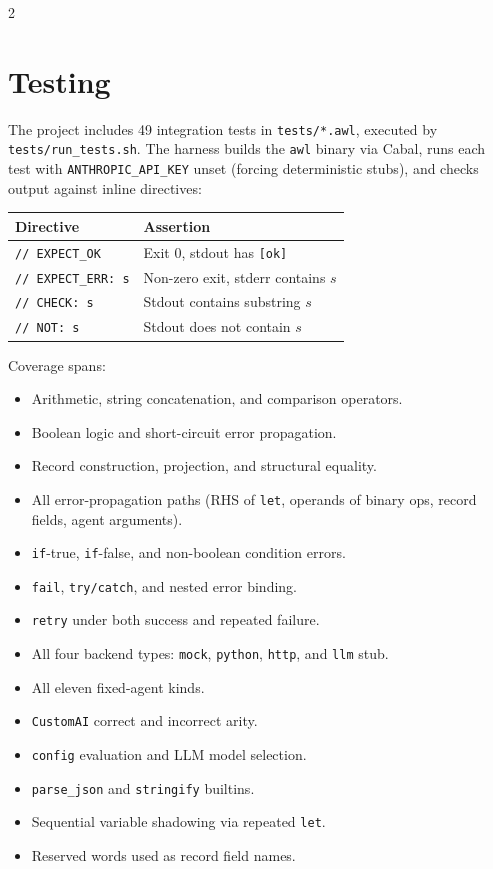 \documentclass[10pt]{article}
\begin{document}
\begin{multicols}{2}
\section{Testing}
\label{sec:testing}

The project includes 49 integration tests in \texttt{tests/*.awl}, executed
by \texttt{tests/run\_tests.sh}.  The harness builds the \texttt{awl}
binary via Cabal, runs each test with \texttt{ANTHROPIC\_API\_KEY} unset
(forcing deterministic stubs), and checks output against inline
directives:

\begin{center}
\small
\begin{tabular}{ll}
\toprule
Directive & Assertion \\
\midrule
\texttt{// EXPECT\_OK}     & Exit 0, stdout has \texttt{[ok]} \\
\texttt{// EXPECT\_ERR: s} & Non-zero exit, stderr contains $s$ \\
\texttt{// CHECK: s}       & Stdout contains substring $s$ \\
\texttt{// NOT: s}         & Stdout does not contain $s$ \\
\bottomrule
\end{tabular}
\end{center}

\noindent Coverage spans:

\begin{itemize}
  \item Arithmetic, string concatenation, and comparison operators.
  \item Boolean logic and short-circuit error propagation.
  \item Record construction, projection, and structural equality.
  \item All error-propagation paths (RHS of \texttt{let}, operands
        of binary ops, record fields, agent arguments).
  \item \texttt{if}-true, \texttt{if}-false, and non-boolean
        condition errors.
  \item \texttt{fail}, \texttt{try/catch}, and nested error binding.
  \item \texttt{retry} under both success and repeated failure.
  \item All four backend types: \texttt{mock}, \texttt{python},
        \texttt{http}, and \texttt{llm} stub.
  \item All eleven fixed-agent kinds.
  \item \texttt{CustomAI} correct and incorrect arity.
  \item \texttt{config} evaluation and LLM model selection.
  \item \texttt{parse\_json} and \texttt{stringify} builtins.
  \item Sequential variable shadowing via repeated \texttt{let}.
  \item Reserved words used as record field names.
\end{itemize}


\end{multicols}
\end{document}
